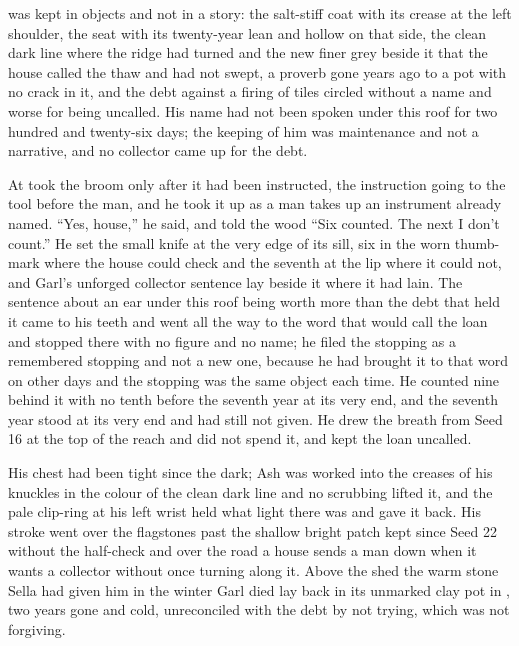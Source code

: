  was kept in objects and not in a story: the salt-stiff coat with its crease at the left shoulder, the seat with its twenty-year lean and hollow on that side, the clean dark line where the ridge had turned and the new finer grey beside it that the house called the thaw and had not swept, a proverb gone years ago to a pot with no crack in it, and the debt against a firing of tiles circled without a name and worse for being uncalled. His name had not been spoken under this roof for two hundred and twenty-six days; the keeping of him was maintenance and not a narrative, and no collector came up  for the debt.

At   took the broom only after it had been instructed, the instruction going to the tool before the man, and he took it up as a man takes up an instrument already named. “Yes, house,” he said, and told the wood “Six counted. The next I don't count.” He set the small knife at the very edge of its sill, six in the worn thumb-mark where the house could check and the seventh at the lip where it could not, and Garl's unforged collector sentence lay beside it where it had lain. The sentence about an ear under this roof being worth more than the debt that held it came to his teeth and went all the way to the word that would call the loan and stopped there with no figure and no name; he filed the stopping as a remembered stopping and not a new one, because he had brought it to that word on other days and the stopping was the same object each time. He counted nine behind it with no tenth before the seventh year at its very end, and the seventh year stood at its very end and had still not given. He drew the breath from Seed 16 at the top of the reach and did not spend it, and kept the loan uncalled.

His chest had been tight since the dark; Ash was worked into the creases of his knuckles in the colour of the clean dark line and no scrubbing lifted it, and the pale clip-ring at his left wrist held what light there was and gave it back. His stroke went over the flagstones past the shallow bright patch kept since Seed 22 without the half-check and over the road a house sends a man down when it wants a collector without once turning along it. Above the shed the warm stone Sella had given him in the winter Garl died lay back in its unmarked clay pot in , two years gone and cold, unreconciled with the debt by not trying, which was not forgiving.

\scenebreak

